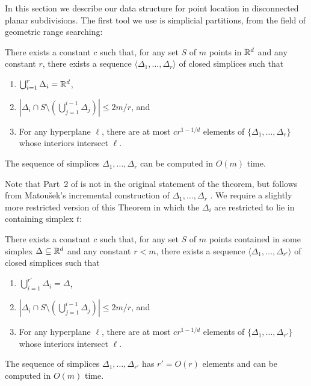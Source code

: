 \documentclass{patmorin}
\begin{document}
In this section we describe our data structure for point location in
disconnected planar subdivisions.  The first tool we use is simplicial
partitions, from the field of geometric range searching:

\begin{thm}[Matou\v{s}ek 1992]
There exists a constant $c$ such that, for any set $S$ of $m$
points in $\mathbb{R}^d$ and any constant $r$, there exists a sequence
$\langle \Delta_1,\ldots,\Delta_r\rangle$ of closed simplices such that
  \begin{enumerate}
    \item $\bigcup_{i=1}^r \Delta_i = \mathbb{R}^d$,
    \item $\left|\Delta_i \cap S\setminus
    \left(\bigcup_{j=1}^{i-1}\Delta_j\right)\right| \le 2m/r$, and
    \item For any hyperplane $\ell$, there are at most $cr^{1-1/d}$ elements of
  $\{\Delta_1,\ldots,\Delta_r\}$ whose interiors intersect $\ell$.
  \end{enumerate}
  The sequence of simplices $\Delta_1,\ldots,\Delta_r$ can be computed
  in $O(m)$ time.
\end{thm}

Note that Part~2 of  is not in the original
statement of the theorem, but follows from Matou\v{s}ek's incremental
construction of $\Delta_1,\ldots,\Delta_r$ \cite{m92}.  We require a
slightly more restricted version of this Theorem in which the $\Delta_i$
are restricted to lie in containing simplex $t$:

\begin{cor}
There exists a constant $c$ such that, for any set $S$ of $m$ points
contained in some simplex $\Delta \subseteq \mathbb{R}^d$ and any constant $r<m$,
there exists a sequence
$\langle \Delta_1,\ldots,\Delta_{r'}\rangle$ of closed simplices such that
  \begin{enumerate}
    \item $\bigcup_{i=1}^{r'} \Delta_i = \Delta$,
    \item $\left|\Delta_i \cap S\setminus
    \left(\bigcup_{j=1}^{i-1}\Delta_j\right)\right| \le 2m/r$, and
    \item For any hyperplane $\ell$, there are at most $cr^{1-1/d}$ elements of
  $\{\Delta_1,\ldots,\Delta_{r'}\}$ whose interiors intersect $\ell$.
  \end{enumerate}
  The sequence of simplices $\Delta_1,\ldots,\Delta_{r'}$ has $r'=O(r)$
  elements and can be computed in $O(m)$ time.
\end{cor}
\end{document}

